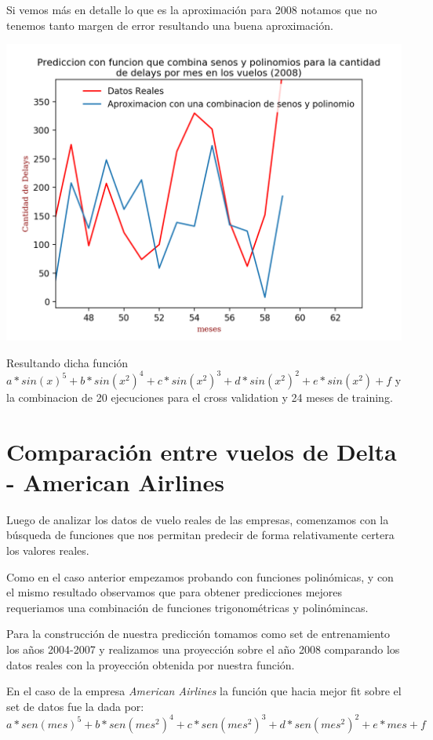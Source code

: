 \documentclass{endm}
\begin{document}
Si vemos m\'as en detalle lo que es la aproximaci\'on para 2008 notamos que no tenemos tanto margen de error resultando una buena aproximaci\'on.

	\begin{center}
	\includegraphics[scale=0.8]{imagenes/delays2008.png}
	\end{center}

Resultando dicha funci\'on $a*sin(x)^5+b*sin(x^2)^4+c*sin(x^2)^3+d*sin(x^2)^2+e*sin(x^2)+f$ y la combinacion de 20 ejecuciones para el cross validation y 24 meses de training.

\section{Comparaci\'on entre vuelos de Delta - American Airlines}

Luego de analizar los datos de vuelo reales de las empresas, comenzamos con la b\'usqueda de funciones que nos permitan predecir de forma relativamente certera los valores reales.

Como en el caso anterior empezamos probando con funciones polin\'omicas, y con el mismo resultado observamos que para obtener predicciones mejores requeriamos una combinaci\'on de funciones trigonom\'etricas y polin\'omincas.

Para la construcci\'on de nuestra predicci\'on tomamos como set de entrenamiento los a\~nos 2004-2007 y realizamos una proyecci\'on sobre el a\~no 2008 comparando los datos reales con la proyecci\'on obtenida por nuestra funci\'on.

En el caso de la empresa \textit{American Airlines} la funci\'on que hacia mejor fit sobre el set de datos fue la dada por:
$a * sen(mes)^5 + b * sen(mes^2)^4 + c * sen(mes^2)^3 + d * sen(mes^2)^2 + e * mes + f$
\end{document}
